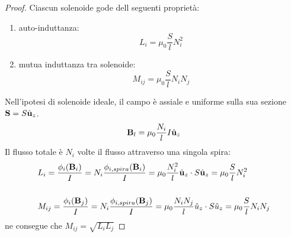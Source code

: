 \begin{proof}
Ciascun solenoide gode dell seguenti propriet\`a:
\begin{enumerate}
	\item auto-induttanza:
	\begin{equation*}
		L_i = \mu_0 \frac{S}{l}N_i^2
	\end{equation*}
	\item mutua induttanza tra solenoide:
	\begin{equation*}
		M_{ij} = \mu_0 \frac{S}{l}N_i N_j
	\end{equation*}
\end{enumerate}
Nell'ipotesi di solenoide ideale, il campo \`e assiale e uniforme sulla sua sezione $\bold{S} = S \hat{\bold{u}}_z$.
\begin{equation*}
	\bold{B}_l = \mu_0 \frac{N_i}{l}I \hat{\bold{u}}_z
\end{equation*}
Il flusso totale \`e $N_i$ volte il flusso attraverso una singola spira:
\begin{align*}
	& L_i = \frac{\phi_i(\bold{B}_i)}{I} = N_i \frac{\phi_{i,spira}(\bold{B}_i)}{I} = \mu_0 \frac{N_i^2}{l}\hat{\bold{u}}_z \cdot S \hat{\bold{u}}_z = \mu_{0} \frac{S}{l}N_i^2 \\ \rule{0pt}{30pt}
	& M_{ij} = \frac{\phi_i(\bold{B}_j)}{I} = N_i \frac{\phi_{i,spira}(\bold{B}_j)}{I} = \mu_0 \frac{N_i N_j}{l} \hat{u}_z \cdot S \hat{u}_z = \mu_0\frac{S}{l}N_iN_j
\end{align*}
ne consegue che $M_{ij} = \sqrt{L_i L_j}$
\newline


\end{proof}
